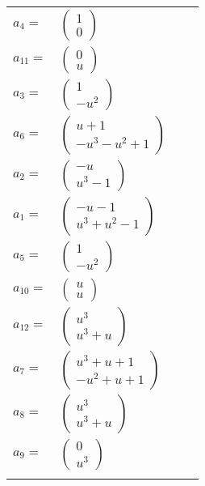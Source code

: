 \documentclass[1p]{elsarticle_modified}
\theoremstyle{definition}
\begin{document}
\begin{tabular}{m{7pt} m{180pt} m{7pt} m{180pt} }
\flushright $a_{4}=$&$\begin{pmatrix}1\\0\end{pmatrix}$ \\
\flushright $a_{11}=$&$\begin{pmatrix}0\\u\end{pmatrix}$ \\
\flushright $a_{3}=$&$\begin{pmatrix}1\\- u^2\end{pmatrix}$ \\
\flushright $a_{6}=$&$\begin{pmatrix}u+1\\- u^3- u^2+1\end{pmatrix}$ \\
\flushright $a_{2}=$&$\begin{pmatrix}- u\\u^3-1\end{pmatrix}$ \\
\flushright $a_{1}=$&$\begin{pmatrix}- u-1\\u^3+u^2-1\end{pmatrix}$ \\
\flushright $a_{5}=$&$\begin{pmatrix}1\\- u^2\end{pmatrix}$ \\
\flushright $a_{10}=$&$\begin{pmatrix}u\\u\end{pmatrix}$ \\
\flushright $a_{12}=$&$\begin{pmatrix}u^3\\u^3+u\end{pmatrix}$ \\
\flushright $a_{7}=$&$\begin{pmatrix}u^3+u+1\\- u^2+u+1\end{pmatrix}$ \\
\flushright $a_{8}=$&$\begin{pmatrix}u^3\\u^3+u\end{pmatrix}$ \\
\flushright $a_{9}=$&$\begin{pmatrix}0\\u^3\end{pmatrix}$\\&\end{tabular}
\end{document}
